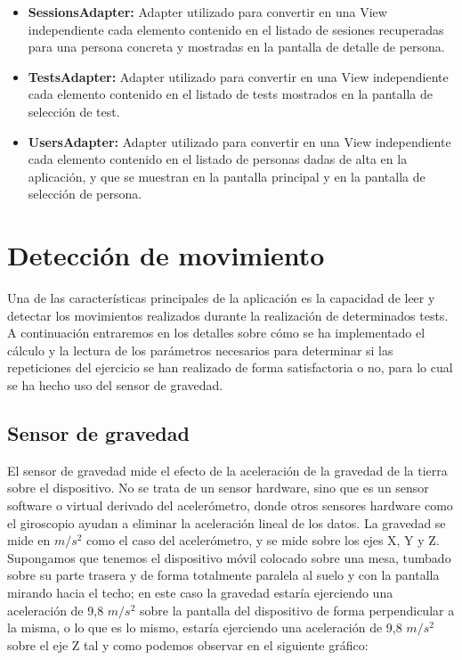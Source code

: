 \begin{itemize}
\item \textbf{SessionsAdapter:} Adapter utilizado para convertir en una View independiente cada elemento contenido en el listado de sesiones recuperadas para una persona concreta y mostradas en la pantalla de detalle de persona.
\item \textbf{TestsAdapter:} Adapter utilizado para convertir en una View independiente cada elemento contenido en el listado de tests mostrados en la pantalla de selección de test.
\item \textbf{UsersAdapter:} Adapter utilizado para convertir en una View independiente cada elemento contenido en el listado de personas dadas de alta en la aplicación, y que se muestran en la pantalla principal y en la pantalla de selección de persona.
\end{itemize}

\section{Detección de movimiento}

Una de las características principales de la aplicación es la capacidad de leer y detectar los movimientos realizados durante la realización de determinados tests. A continuación entraremos en los detalles sobre cómo se ha implementado el cálculo y la lectura de los parámetros necesarios para determinar si las repeticiones del ejercicio se han realizado de forma satisfactoria o no, para lo cual se ha hecho uso del sensor de gravedad.\\

\subsection{Sensor de gravedad}

El sensor de gravedad mide el efecto de la aceleración de la gravedad de la tierra sobre el dispositivo. No se trata de un sensor hardware, sino que es un sensor software o virtual derivado del acelerómetro, donde otros sensores hardware como el giroscopio ayudan a eliminar la aceleración lineal de los datos. La gravedad se mide en $m/s^{2}$ como el caso del acelerómetro, y se mide sobre los ejes X, Y y Z.\\

Supongamos que tenemos el dispositivo móvil colocado sobre una mesa, tumbado sobre su parte trasera y de forma totalmente paralela al suelo y con la pantalla mirando hacia el techo; en este caso la gravedad estaría ejerciendo una aceleración de 9,8 $m/s^{2}$ sobre la pantalla del dispositivo de forma perpendicular a la misma, o lo que es lo mismo, estaría ejerciendo una aceleración de 9,8 $m/s^{2}$ sobre el eje Z tal y como podemos observar en el siguiente gráfico:

